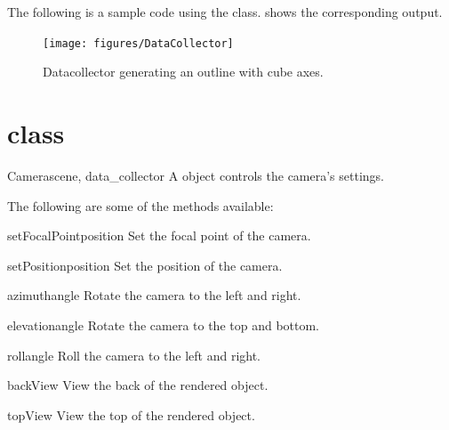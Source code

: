 The following is a sample code using the \DataCollector class. 
 shows the corresponding output. 


\begin{figure}[ht]
\begin{center}
\texttt{[image: figures/DataCollector]}
\end{center}
\caption{Datacollector generating an outline with cube axes.}
\label{fig:datacollector.1}
\end{figure}

\section{\Camera class}
\begin{classdesc}{Camera}{scene, data_collector}
A \Camera object controls the camera's settings.
\end{classdesc}

The following are some of the methods available:
\begin{methoddesc}[Camera]{setFocalPoint}{position}
Set the focal point of the camera.
\end{methoddesc}

\begin{methoddesc}[Camera]{setPosition}{position}
Set the position of the camera.
\end{methoddesc}

\begin{methoddesc}[Camera]{azimuth}{angle}
Rotate the camera to the left and right.
\end{methoddesc}

\begin{methoddesc}[Camera]{elevation}{angle}
Rotate the camera to the top and bottom.
\end{methoddesc}

\begin{methoddesc}[Camera]{roll}{angle}
Roll the camera to the left and right.
\end{methoddesc}

\begin{methoddesc}[Camera]{backView}{}
View the back of the rendered object.
\end{methoddesc}

\begin{methoddesc}[Camera]{topView}{}
View the top of the rendered object.
\end{methoddesc}

